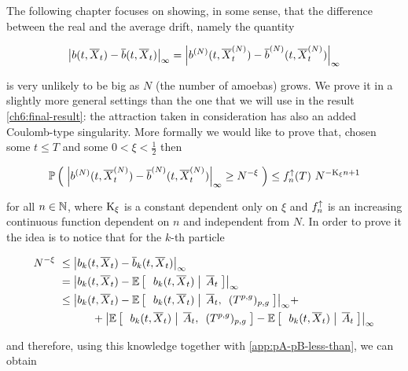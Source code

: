 The following chapter focuses on showing, in some sense, that the difference between the real and the average drift, namely the quantity

\begin{equation}
	{ \left| 
		b(t, \overline{X}_t)
		-
		\overline{b}(t, \overline{X}_t)
	 \right|_{\infty} }
	=
	{ \left| 
		b^{(N)}(t, \overline{X}_t^{(N)})
		-
		\overline{b}^{(N)}(t, \overline{X}_t^{(N)})
	 \right|_{\infty} }
\end{equation}

is very unlikely to be big as $N$ (the number of amoebas) grows.
We prove it in a slightly more general settings than the one that we will use in the result \ref{ch6:final-result}: the attraction taken in consideration has also an added Coulomb-type singularity.
More formally we would like to prove that, chosen some $t\leq T$ and  some $0<\xi < \frac{1}{2}$ then

\begin{equation}
	\mathbb{P} \left( \; 
		{ \left| 
			b^{(N)}(t, \overline{X}_t^{(N)})
			-
			\overline{b}^{(N)}(t, \overline{X}_t^{(N)})
	 \right|_{\infty} }
	\geq
	N^{-\xi}
	 \; \right)
	\leq
	f^\uparrow_n(T)\
	N^{-\text{K}_\xi n + 1}
\end{equation}

for all $n \in \mathbb{N}$, where $\text{K}_\xi$ is a constant dependent only on $\xi$ and $f^\uparrow_n$ is an increasing continuous function dependent on $n$ and independent from $N$.
In order to prove it the idea is to notice that for the $k$-th particle

\begin{align*}
	N^{-\xi}\
	&\leq
	{ \left| 
		b_k(t, \overline{X}_t)
		-
		\overline{b}_k(t, \overline{X}_t)
	 \right|_{\infty} }
	\\
	&=
	{ \left| 
		b_k(t, \overline{X}_t)
		-
		\mathbb{E} \left[ \; \left. \; b_k(t, \overline{X}_t) \; \right| \;  \overline{A}_t \; \right]
	 \right|_{\infty} }
	\\
	&\leq
	{ \left| 
		b_k(t, \overline{X}_t)
		-
		\mathbb{E} \left[ \; \left. \; b_k(t, \overline{X}_t) \; \right| \;  \overline{A}_t, \:\;(T^{p,g})_{p,g} \; \right]
	 \right|_{\infty} } +
	\\
	&\qquad\quad
	+
	{ \left| 
		\mathbb{E} \left[ \; \left. \; b_k(t, \overline{X}_t) \; \right| \;  \overline{A}_t, \:\;(T^{p,g})_{p,g} \; \right]
		-
		\mathbb{E} \left[ \; \left. \; b_k(t, \overline{X}_t) \; \right| \;  \overline{A}_t \; \right]
	 \right|_{\infty} }
\end{align*}

and therefore, using this knowledge together with \ref{app:pA-pB-less-than}, we can obtain

